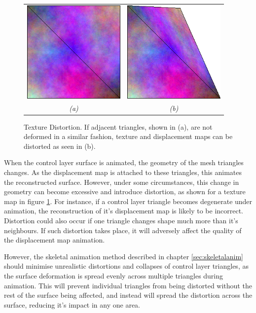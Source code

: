 \begin{figure}
\begin{center}
\begin{tabular}{cc} 
\includegraphics[width=5cm]{../images/texture_distort1} & 
\includegraphics[width=5cm]{../images/texture_distort2} \\ 
{\it(a)} & {\it(b)}
\end{tabular}
\caption[Texture Distortion]{\label{fig:distortion} Texture Distortion. If adjacent triangles, shown in (a),  are not deformed in a similar fashion, texture and displacement maps can be distorted as seen in (b).}
\end{center}
\end{figure}
When the control layer surface is animated, the geometry of the mesh triangles changes. As the displacement map is attached to these triangles, this animates the reconstructed surface. However, under some circumstances, this change in geometry can become excessive and introduce distortion, as shown for a texture map in figure \ref{fig:distortion}. For instance, if a control layer triangle becomes degenerate under animation, the reconstruction of it's displacement map is likely to be incorrect. Distortion could also occur if one triangle changes shape much more than it's neighbours. If such distortion takes place, it will adversely affect the quality of the displacement map animation.

However, the skeletal animation method described in chapter \ref{sec:skeletalanim} should minimise unrealistic distortions and collapses of control layer triangles, as the surface deformation is spread evenly across multiple triangles during animation. This will prevent individual triangles from being distorted without the rest of the surface being affected, and instead will spread the distortion across the surface, reducing it's impact in any one area.

